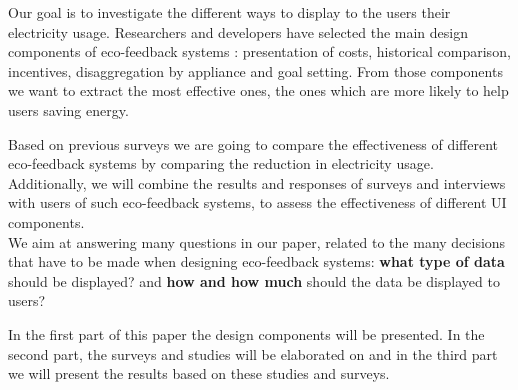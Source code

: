 \documentclass[journal]{vgtc}                %
\begin{document}
Our goal is to investigate the different ways to display to the users their electricity usage.
Researchers and developers have selected %
the main design components of eco-feedback systems \cite{karjalainen2011consumer, jain2012assessing}: presentation of costs, historical comparison, incentives, disaggregation by appliance and goal setting. From those components we want to extract the most effective ones, the ones which are more likely to help users saving energy. 


Based on previous surveys we are going to compare the effectiveness of different eco-feedback systems by comparing the reduction in electricity usage. %
Additionally, we will combine the results and responses of surveys and interviews with users of such eco-feedback systems, to assess the effectiveness of different UI components. \\

We aim at answering many questions in our paper, related to the many decisions that have to be made when designing eco-feedback systems: \textbf{what type of data} should be displayed? and \textbf{how and how much} should the data be displayed to users? 

In the first part of this paper the design components will be presented. In the second part, the surveys and studies will be elaborated on and in the third part we will present the results based on these studies and surveys. %


\end{document}

